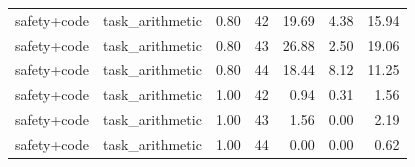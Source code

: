 \documentclass{article}
\begin{document}
\begin{table}[H]
{\begin{tabular}{llllrrr}
safety+code & task\_arithmetic & 0.80 & 42 & 19.69 & 4.38 & 15.94 \\
safety+code & task\_arithmetic & 0.80 & 43 & 26.88 & 2.50 & 19.06 \\
safety+code & task\_arithmetic & 0.80 & 44 & 18.44 & 8.12 & 11.25 \\
safety+code & task\_arithmetic & 1.00 & 42 & 0.94 & 0.31 & 1.56 \\
safety+code & task\_arithmetic & 1.00 & 43 & 1.56 & 0.00 & 2.19 \\
safety+code & task\_arithmetic & 1.00 & 44 & 0.00 & 0.00 & 0.62 \\
\bottomrule
\end{tabular}
}
\end{table}


\end{document}
